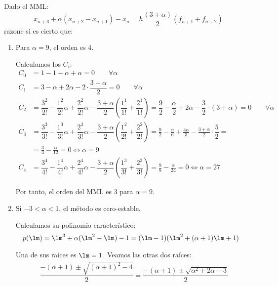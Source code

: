 \begin{ejercicio}\label{ej:3.1.16}
    Dado el MML:
    \begin{equation*}
        x_{n+3} + \alpha (x_{n+2} - x_{n+1}) - x_n = h \frac{(3 + \alpha)}{2} (f_{n+1} + f_{n+2})
    \end{equation*}
    razone si es cierto que:
    \begin{enumerate}
        \item Para $\alpha = 9$, el orden es 4.
        
        Calculamos los $C_i$:
        \begin{align*}
            C_0 &= 1 -1 - \alpha+\alpha = 0\qquad \forall \alpha\\
            C_1 &= 3-\alpha+2\alpha - 2\cdot \dfrac{3+\alpha}{2} = 0\qquad \forall \alpha\\
            C_2 &= \dfrac{3^2}{2!} - \dfrac{1^2}{2!}\alpha + \dfrac{2^2}{2!}\alpha - \dfrac{3+\alpha}{2}\left(\dfrac{1^1}{1!} + \dfrac{2^1}{1!}\right)
            = \dfrac{9}{2} - \dfrac{\alpha}{2} + 2\alpha - \dfrac{3}{2}\cdot (3+\alpha) = 0\qquad \forall \alpha\\
            C_3 &= \dfrac{3^3}{3!} - \dfrac{1^3}{3!}\alpha + \dfrac{2^3}{3!}\alpha - \dfrac{3+\alpha}{2}\left(\dfrac{1^2}{2!} + \dfrac{2^2}{2!}\right)
            = \frac{9}{2} - \frac{\alpha}{6} + \frac{4\alpha}{3} - \frac{3+\alpha}{2}\cdot \dfrac{5}{2}
            =\\&=\frac{3}{4} - \frac{\alpha}{12} = 0\iff \alpha = 9\\
            C_4 &= \dfrac{3^4}{4!} - \dfrac{1^4}{4!}\alpha + \dfrac{2^4}{4!}\alpha - \dfrac{3+\alpha}{2}\left(\dfrac{1^3}{3!} + \dfrac{2^3}{3!}\right)
            = \frac{9}{8} - \frac{\alpha}{24} =0\iff \alpha = 27
        \end{align*}

        Por tanto, el orden del MML es $3$ para $\alpha = 9$.
        \item Si $-3 < \alpha < 1$, el método es cero-estable.
        
        Calculamos su polinomio característico:
        \begin{align*}
            p(\lm) &= \lm^3 + \alpha (\lm^2 - \lm) - 1
            = (\lm - 1)(\lm^2 + (\alpha + 1)\lm + 1)
        \end{align*}

        Una de sus raíces es $\lm = 1$. Veamos las otras dos raíces:
        \begin{align*}
            \dfrac{-(\alpha + 1) \pm \sqrt{(\alpha + 1)^2 - 4}}{2}
            = \dfrac{-(\alpha + 1) \pm \sqrt{\alpha^2 + 2\alpha - 3}}{2}
        \end{align*}


\end{enumerate}
\end{ejercicio}
